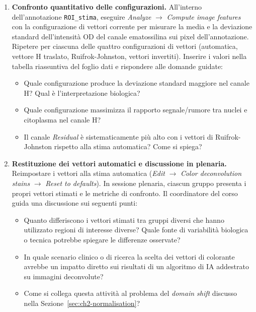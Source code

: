 \begin{enumerate}
\begin{enumerate}[label=\alph*.]
        \item \textbf{Vettori invertiti:} scambiare i vettori H ed E (assegnare al canale H
        il vettore precedentemente assegnato a E e viceversa) e osservare l'effetto sulla
        separazione cromatica.
    \end{enumerate}
    Per ciascuna configurazione, acquisire uno screenshot del canale \textit{Hematoxylin} e del
    canale \textit{Eosin} e completare la colonna corrispondente del foglio dati.

    \item \textbf{Confronto quantitativo delle configurazioni.}
    All'interno dell'annotazione \texttt{ROI\_stima}, eseguire
    \textit{Analyze} $\to$ \textit{Compute image features} con la configurazione di vettori
    corrente per misurare la media e la deviazione standard dell'intensità OD del canale
    ematossilina sui pixel dell'annotazione. Ripetere per ciascuna delle quattro configurazioni
    di vettori (automatica, vettore H traslato, Ruifrok-Johnston, vettori invertiti).
    Inserire i valori nella tabella riassuntiva del foglio dati e rispondere alle domande
    guidate:
    \begin{itemize}
        \item Quale configurazione produce la deviazione standard maggiore nel canale H?
        Qual è l'interpretazione biologica?
        \item Quale configurazione massimizza il rapporto segnale/rumore tra nuclei e
        citoplasma nel canale H?
        \item Il canale \textit{Residual} è sistematicamente più alto con i vettori di
        Ruifrok-Johnston rispetto alla stima automatica? Come si spiega?
    \end{itemize}

    \item \textbf{Restituzione dei vettori automatici e discussione in plenaria.}
    Reimpostare i vettori alla stima automatica (\textit{Edit} $\to$
    \textit{Color deconvolution stains} $\to$ \textit{Reset to defaults}). In sessione
    plenaria, ciascun gruppo presenta i propri vettori stimati e le metriche di confronto.
    Il coordinatore del corso guida una discussione sui seguenti punti:
    \begin{itemize}
        \item Quanto differiscono i vettori stimati tra gruppi diversi che hanno utilizzato
        regioni di interesse diverse? Quale fonte di variabilità biologica o tecnica potrebbe
        spiegare le differenze osservate?
        \item In quale scenario clinico o di ricerca la scelta dei vettori di colorante avrebbe
        un impatto diretto sui risultati di un algoritmo di IA addestrato su immagini
        deconvolute?
        \item Come si collega questa attività al problema del \emph{domain shift} discusso
        nella Sezione~\ref{sec:ch2-normalisation}?
    \end{itemize}

\end{enumerate}

